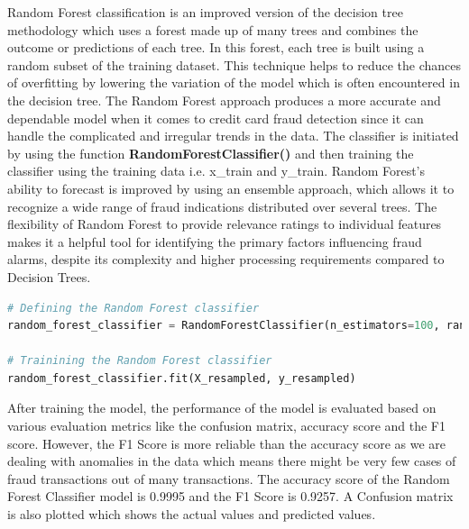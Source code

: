 Random Forest classification is an improved version of the decision tree methodology which uses a forest made up of many trees and combines the outcome or predictions of each tree. In this forest, each tree is built using a random subset of the training dataset. This technique helps to reduce the chances of overfitting by lowering the variation of the model which is often encountered in the decision tree. The Random Forest approach produces a more accurate and dependable model when it comes to credit card fraud detection since it can handle the complicated and irregular trends in the data. The classifier is initiated by using the function \textbf{RandomForestClassifier() }and then training the classifier using the training data i.e. x\_train and y\_train. Random Forest’s ability to forecast is improved by using an ensemble approach, which allows it to recognize a wide range of fraud indications distributed over several trees. The flexibility of Random Forest to provide relevance ratings to individual features makes it a helpful  tool for identifying the primary factors influencing fraud alarms, despite its complexity and higher processing requirements compared to Decision Trees.

\begin{lstlisting}[language=Python, caption={Code snippet in \LaTeX ~and  this is a Python code example}, label=list:python_code_ex]
# Defining the Random Forest classifier
random_forest_classifier = RandomForestClassifier(n_estimators=100, random_state=42)

# Trainining the Random Forest classifier
random_forest_classifier.fit(X_resampled, y_resampled)
\end{lstlisting}


\clearpage

 After training the model, the performance of the model is evaluated based on various evaluation metrics like the confusion matrix, accuracy score and the F1 score. However, the F1 Score is more reliable than the accuracy score as we are dealing with anomalies in the data which means there might be very few cases of fraud transactions out of many transactions. The accuracy score of the Random Forest Classifier model is 0.9995 and the F1 Score is 0.9257. A Confusion matrix is also plotted which shows the actual values and predicted values.


